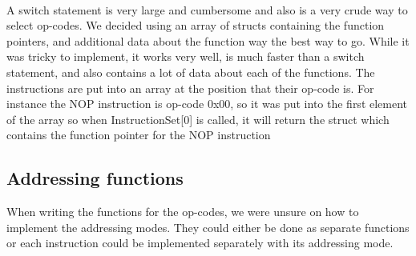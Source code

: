 \documentclass[conference]{IEEEtran}
\begin{document}
\\

A switch statement is very large and cumbersome and also is a very crude way to select op-codes. We decided using an array of structs containing the function pointers, and additional data about the function way the best way to go. While it was tricky to implement, it works very well, is much faster than a switch statement, and also contains a lot of data about each of the functions. The instructions are put into an array at the position that their op-code is. For instance the NOP instruction is op-code 0x00, so it was put into the first element of the array so when InstructionSet[0] is called, it will return the struct which contains the function pointer for the NOP instruction

\subsection{Addressing functions}

When writing the functions for the op-codes, we were unsure on how to implement the addressing modes. They could either be done as separate functions or each instruction could be implemented separately with its addressing mode.\\

\\
\end{document}
